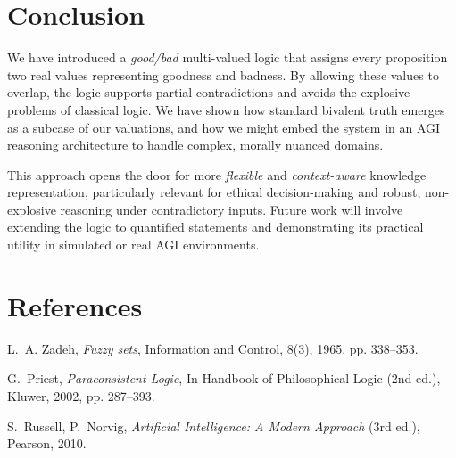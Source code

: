 \documentclass[11pt]{article}
\begin{document}
\section{Conclusion}

We have introduced a \emph{good/bad} multi-valued logic that assigns every proposition two real 
values representing goodness and badness. By allowing these values to overlap, the logic 
supports partial contradictions and avoids the explosive problems of classical logic. 
We have shown how standard bivalent truth emerges as a subcase of our valuations, 
and how we might embed the system in an AGI reasoning architecture to handle complex, 
morally nuanced domains. 

This approach opens the door for more \emph{flexible} and \emph{context-aware} knowledge 
representation, particularly relevant for ethical decision-making and robust, non-explosive 
reasoning under contradictory inputs. Future work will involve extending the logic to 
quantified statements and demonstrating its practical utility in simulated or real AGI 
environments.

\section*{References}

\begin{thebibliography}{9}

L.~A. Zadeh,
\newblock \emph{Fuzzy sets},
\newblock Information and Control, 8(3), 1965, pp. 338--353.

G.~Priest,
\newblock \emph{Paraconsistent Logic},
\newblock In Handbook of Philosophical Logic (2nd ed.), Kluwer, 2002, pp. 287--393.

S.~Russell, P.~Norvig,
\newblock \emph{Artificial Intelligence: A Modern Approach} (3rd ed.),
\newblock Pearson, 2010.

\end{thebibliography}
\end{document}
